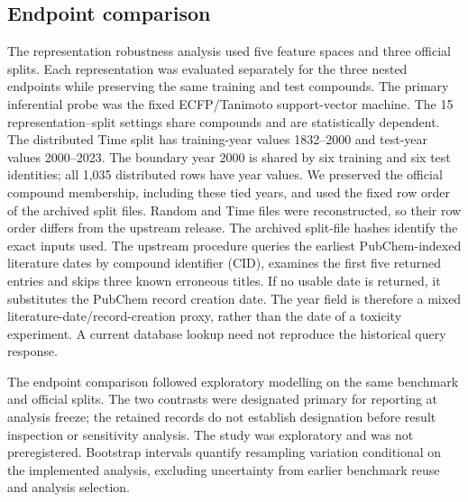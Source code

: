 \documentclass[10pt]{article}
\begin{document}
\subsection*{Endpoint comparison}
The representation robustness analysis used five feature spaces and three official splits. Each representation was evaluated separately for the three nested endpoints while preserving the same training and test compounds. The primary inferential probe was the fixed ECFP/Tanimoto support-vector machine. The 15 representation--split settings share compounds and are statistically dependent.
The distributed Time split has training-year values 1832--2000 and test-year values 2000--2023. The boundary year 2000 is shared by six training and six test identities; all 1,035 distributed rows have year values. We preserved the official compound membership, including these tied years, and used the fixed row order of the archived split files. Random and Time files were reconstructed, so their row order differs from the upstream release. The archived split-file hashes identify the exact inputs used. The upstream procedure queries the earliest PubChem-indexed literature dates by compound identifier (CID), examines the first five returned entries and skips three known erroneous titles. If no usable date is returned, it substitutes the PubChem record creation date. The year field is therefore a mixed literature-date/record-creation proxy, rather than the date of a toxicity experiment. A current database lookup need not reproduce the historical query response.

The endpoint comparison followed exploratory modelling on the same benchmark and official splits. The two contrasts were designated primary for reporting at analysis freeze; the retained records do not establish designation before result inspection or sensitivity analysis. The study was exploratory and was not preregistered. Bootstrap intervals quantify resampling variation conditional on the implemented analysis, excluding uncertainty from earlier benchmark reuse and analysis selection.


\end{document}
